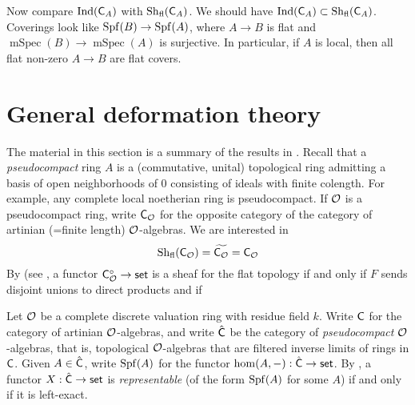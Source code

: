 \documentclass[phd,cornellheadings,draft]{cornell}
\begin{document}
Now compare $\operatorname{Ind}(\mathsf{C}_A)$ with $\operatorname{Sh}_\mathrm{fl}(\mathsf{C}_A)$. 
We should have $\operatorname{Ind}(\mathsf{C}_A)\subset \operatorname{Sh}_\mathrm{fl}(\mathsf{C}_A)$. 
Coverings look like $\operatorname{Spf}(B)\to \operatorname{Spf}(A)$, where $A\to B$ is flat and 
$\operatorname{mSpec}(B)\to \operatorname{mSpec}(A)$ is surjective. In particular, if 
$A$ is local, then all flat non-zero $A\to B$ are flat covers. 



\section{General deformation theory}

The material in this section is a summary of the results in 
\cite[7\textsubscript{b} \S0--2]{sga3-i}. Recall that a \emph{pseudocompact} 
ring $A$ is a (commutative, unital) topological ring admitting a basis of 
open neighborhoods of $0$ consisting of ideals with finite colength. For 
example, any complete local noetherian ring is pseudocompact. If 
$\mathcal{O}$ is a pseudocompact ring, write $\mathsf{C}_{\mathcal{O}}$ for the opposite category 
of the category of artinian (=finite length) $\mathcal{O}$-algebras. We are interested 
in 
\[
  \mathrm{Sh}_\mathrm{fl}(\mathsf{C}_{\mathcal{O}}) = \widetilde{\mathsf{C}_{\mathcal{O}}} = \mathsf{C}_{\mathcal{O}}
\]
By \cite[IV 4.3.5]{sga3-i} (see \cite[VII\textsubscript{B} 1.5]{sga3-i}, a 
functor $\mathsf{C}_{\mathcal{O}}^\circ\to\mathsf{set}$ is a sheaf for the flat topology if and 
only if $F$ sends disjoint unions to direct products and if 

Let $\mathcal{O}$ be a complete discrete valuation ring with residue field $k$. Write 
$\mathsf{C}$ for the category of artinian $\mathcal{O}$-algebras, and write 
$\hat{\mathsf{C}}$ be the category of \emph{pseudocompact} $\mathcal{O}$-algebras, that is, 
topological $\mathcal{O}$-algebras that are filtered inverse limits of rings in 
$\mathsf{C}$. Given $A\in \hat{\mathsf{C}}$, write $\operatorname{Spf}(A)$ for the 
functor $\hom(A,-):\hat{\mathsf{C}}\to \mathsf{set}$. By 
\cite[$\mathrm{VII_B}$ \S 0.4]{sga3-i}, a functor $X:\hat{\mathsf{C}}\to \mathsf{set}$ is 
\emph{representable} (of the form $\operatorname{Spf}(A)$ for some $A$) if and 
only if it is left-exact. 
\end{document}
